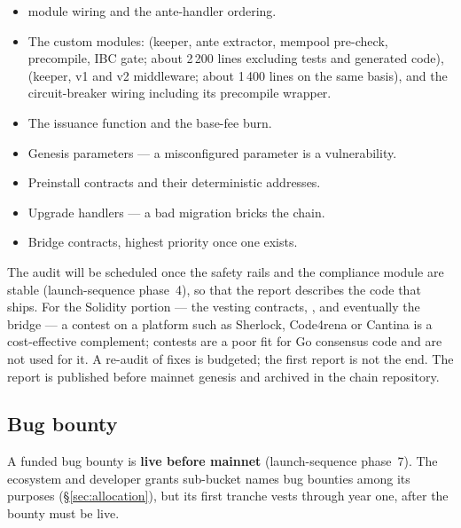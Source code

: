 \begin{itemize}
\item {} module wiring and the ante-handler ordering.
\item The custom modules:  (keeper, ante extractor, mempool
  pre-check, precompile, IBC gate; about 2\,200 lines excluding tests and
  generated code),  (keeper, v1 and v2 middleware; about
  1\,400 lines on the same basis), and the circuit-breaker wiring including
  its precompile wrapper.
\item The issuance function and the base-fee burn.
\item Genesis parameters --- a misconfigured parameter is a vulnerability.
\item Preinstall contracts and their deterministic addresses.
\item Upgrade handlers --- a bad migration bricks the chain.
\item Bridge contracts, highest priority once one exists.
\end{itemize}

The audit will be scheduled once the safety rails and the compliance module are
stable (launch-sequence phase~4), so that the report describes the code that
ships. For the Solidity portion --- the vesting contracts, , and
eventually the bridge --- a contest on a platform such as Sherlock, Code4rena
or Cantina is a cost-effective complement; contests are a poor fit for Go
consensus code and are not used for it. A re-audit of fixes is budgeted; the
first report is not the end. The report is published before mainnet genesis
and archived in the chain repository.


\subsection{Bug bounty}

A funded bug bounty is \textbf{live before mainnet} (launch-sequence phase~7).
The ecosystem and developer grants sub-bucket names bug bounties among its
purposes (\S\ref{sec:allocation}), but its first tranche vests through year
one, after the bounty must be live. 


